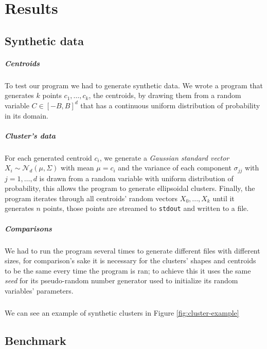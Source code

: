 \documentclass[parskip=full]{report}
\begin{document}
\chapter{Results}

\section{Synthetic data}

\paragraph{Centroids}
To test our program we had to generate synthetic data. We wrote a program that 
generates $k$ points $c_1, \dots, c_k$, the centroids, by drawing them from a 
random variable 
$C \in \left[-B,B\right]^d$ that has a continuous uniform distribution of 
probability in its domain. 

\paragraph{Cluster's data}
For each generated centroid $c_i$, we generate a \emph{Gaussian standard 
vector} $X_i \sim \mathcal{N}_d(\mu, \Sigma)$ with mean $\mu = c_i$ and the 
variance of each component 
$\sigma_{jj}$ with $j = 1, \dots, d$ is 
drawn from a random variable with uniform distribution of probability, this 
allows the program to generate ellipsoidal clusters. Finally, the program 
iterates through all centroids' random vectors $X_0, ..., X_k$ until it 
generates $n$ points, those points are streamed to \texttt{stdout} and written 
to a file.

\paragraph{Comparisons}
We had to run the program several times to generate different files with 
different sizes, for comparison's sake it is necessary for the clusters' shapes 
and centroids to be the same every time the program is ran; to achieve this it 
uses the same  \emph{seed} for its pseudo-random number generator used to 
initialize its random variables' parameters.

\paragraph{}
We can see an example of synthetic clusters in Figure \ref{fig:cluster-example}

\section{Benchmark}
\end{document}
